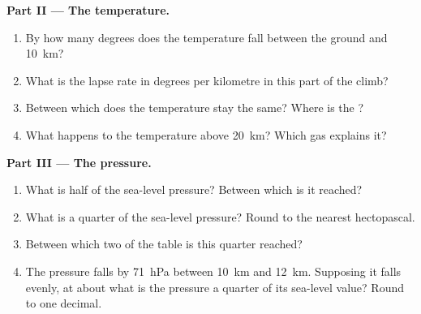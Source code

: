\begin{problem}
\noindent\textbf{Part II --- The temperature.}\par\nopagebreak
\begin{enumerate}[resume, beginpenalty=10000]
  \item By how many degrees does the temperature fall between the ground
        and \qty{10}{km}?
  \item What is the lapse rate in degrees per kilometre in this part of
        the climb?
  \item Between which  does the temperature stay the same?
        Where is the ?
  \item What happens to the temperature above \qty{20}{km}? Which gas
        explains it?
\end{enumerate}

\noindent\textbf{Part III --- The pressure.}\par\nopagebreak
\begin{enumerate}[resume, beginpenalty=10000]
  \item What is half of the sea-level pressure? Between which
         is it reached?
  \item What is a quarter of the sea-level pressure? Round to the nearest
        hectopascal.
  \item Between which two  of the table is this quarter reached?
  \item The pressure falls by \qty{71}{hPa} between \qty{10}{km} and
        \qty{12}{km}. Supposing it falls evenly, at about what 
        is the pressure a quarter of its sea-level value? Round to one
        decimal.
\end{enumerate}
\end{problem}
